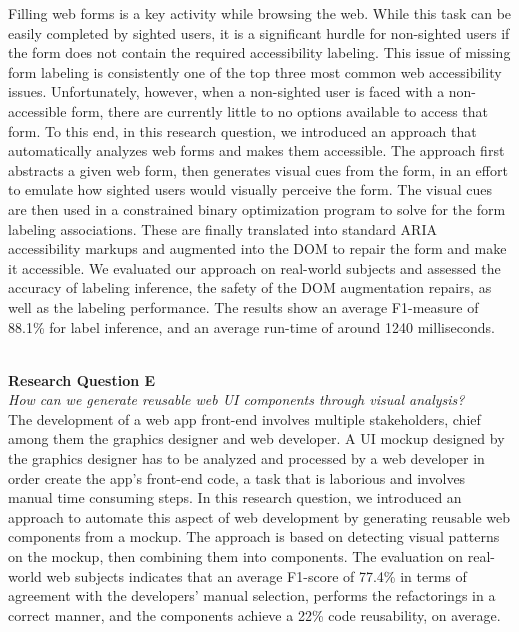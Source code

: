 Filling web forms is a key activity while browsing the web. While this
task can be easily completed by sighted users, it is a significant
hurdle for non-sighted users if the form does not contain the required accessibility labeling. This issue of missing form labeling is consistently one of the top three most common web accessibility
issues. Unfortunately, however, when a non-sighted user is faced
with a non-accessible form, there are currently little to no options
available to access that form. To this end, in this research question, we introduced an approach that automatically analyzes web forms and makes them accessible. The approach first abstracts a given web form, then generates visual cues from the form, in an effort to emulate how sighted users would visually perceive the form. The visual cues are then used in a constrained binary optimization program to solve for the form labeling associations. These are finally translated into standard ARIA accessibility markups and augmented into the DOM to repair the form and make it accessible. We evaluated our approach on real-world subjects and assessed the accuracy of labeling inference, the safety of the DOM augmentation repairs, as well as the labeling performance. The results show an average F1-measure of 88.1\% for label inference, and an average run-time of around 1240 milliseconds.



\ \\ 
\textbf{Research Question E} \\
\textit{How can we generate reusable web UI components through visual analysis?
}
\\ 

The development of a web app front-end involves multiple stakeholders, 
chief among them the graphics designer and web developer. A UI mockup 
designed by the graphics designer has to be analyzed and processed by 
a web developer in order create the app’s front-end code, a task that 
is laborious and involves manual time consuming steps. In this research 
question, we introduced an approach to
automate this aspect of web development by generating reusable
web components from a mockup. The approach is based on detecting 
visual patterns on the mockup, then combining them into components. 
The evaluation on real-world web subjects indicates that an average 
F1-score of 77.4\% in terms of agreement with the developers’ manual selection, 
performs the refactorings in a correct manner, and the components
achieve a 22\% code reusability, on average.

